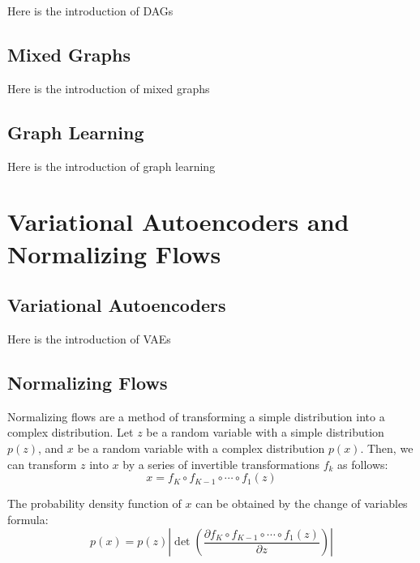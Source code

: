 \documentclass[10pt]{article}
\begin{document}
Here is the introduction of DAGs

\subsection{Mixed Graphs}

Here is the introduction of mixed graphs

\subsection{Graph Learning}

Here is the introduction of graph learning

\section{Variational Autoencoders and Normalizing Flows}

\subsection{Variational Autoencoders}

Here is the introduction of VAEs

\subsection{Normalizing Flows}

Normalizing flows are a method of transforming a simple distribution into a complex distribution. \cite{rezende15normalizingflows} Let $z$ be a random variable with a simple distribution $p(z)$, and $x$ be a random variable with a complex distribution $p(x)$. Then, we can transform $z$ into $x$ by a series of invertible transformations $f_k$ as follows:
\begin{equation}
    x = f_K \circ f_{K-1} \circ \cdots \circ f_1(z)
\end{equation}

The probability density function of $x$ can be obtained by the change of variables formula:
\begin{equation}
    p(x) = p(z) \left| \det \left( \frac{\partial f_K \circ f_{K-1} \circ \cdots \circ f_1(z)}{\partial z} \right) \right|
\end{equation}
\end{document}
